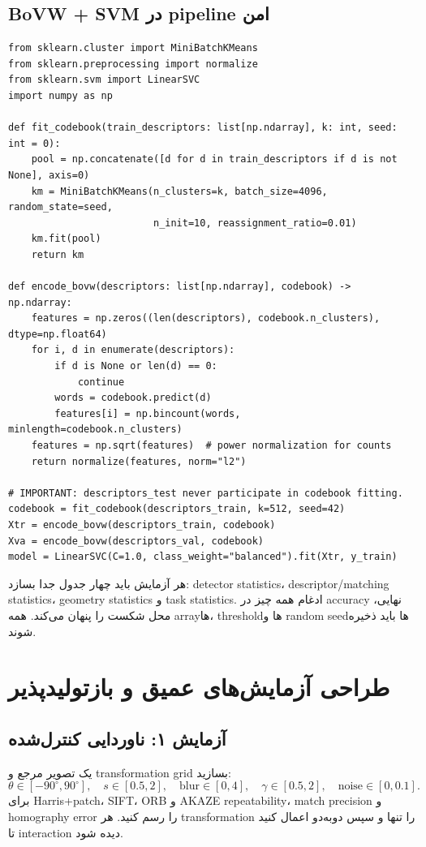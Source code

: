 \documentclass[12pt,openany,oneside]{book}
\begin{document}
\subsection{BoVW + SVM در pipeline امن}
\begin{latin}
\begin{lstlisting}
from sklearn.cluster import MiniBatchKMeans
from sklearn.preprocessing import normalize
from sklearn.svm import LinearSVC
import numpy as np

def fit_codebook(train_descriptors: list[np.ndarray], k: int, seed: int = 0):
    pool = np.concatenate([d for d in train_descriptors if d is not None], axis=0)
    km = MiniBatchKMeans(n_clusters=k, batch_size=4096, random_state=seed,
                         n_init=10, reassignment_ratio=0.01)
    km.fit(pool)
    return km

def encode_bovw(descriptors: list[np.ndarray], codebook) -> np.ndarray:
    features = np.zeros((len(descriptors), codebook.n_clusters), dtype=np.float64)
    for i, d in enumerate(descriptors):
        if d is None or len(d) == 0:
            continue
        words = codebook.predict(d)
        features[i] = np.bincount(words, minlength=codebook.n_clusters)
    features = np.sqrt(features)  # power normalization for counts
    return normalize(features, norm="l2")

# IMPORTANT: descriptors_test never participate in codebook fitting.
codebook = fit_codebook(descriptors_train, k=512, seed=42)
Xtr = encode_bovw(descriptors_train, codebook)
Xva = encode_bovw(descriptors_val, codebook)
model = LinearSVC(C=1.0, class_weight="balanced").fit(Xtr, y_train)
\end{lstlisting}
\end{latin}

\begin{codecontract}
هر آزمایش باید چهار جدول جدا بسازد: detector statistics، descriptor/matching statistics، geometry statistics و task statistics. ادغام همه چیز در accuracy نهایی، محل شکست را پنهان می‌کند. همه arrayها، thresholdها و random seedها باید ذخیره شوند.
\end{codecontract}

\section{طراحی آزمایش‌های عمیق و بازتولیدپذیر}
\subsection{آزمایش ۱: ناوردایی کنترل‌شده}
یک تصویر مرجع و transformation grid بسازید:
\[
\theta\in[-90^\circ,90^\circ],\quad s\in[0.5,2],\quad
\text{blur}\in[0,4],\quad \gamma\in[0.5,2],\quad \text{noise}\in[0,0.1].
\]
برای Harris+patch، SIFT، ORB و AKAZE repeatability، match precision و homography error را رسم کنید. هر transformation را تنها و سپس دو‌به‌دو اعمال کنید تا interaction دیده شود.
\end{document}
